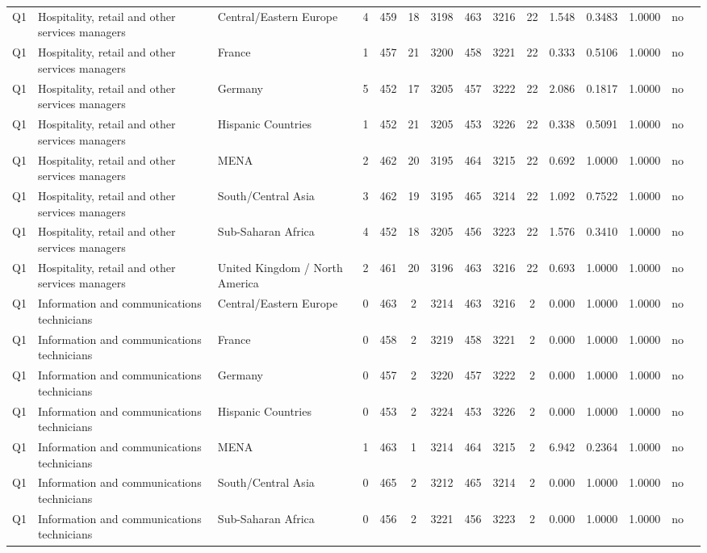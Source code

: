 \begin{longtable}{lllrcccccccccll}
Q1 & Hospitality, retail and other services managers & Central/Eastern Europe & 4 & 459 & 18 & 3198 & 463 & 3216 & 22 & 1.548 & 0.3483 & 1.0000 & no \\
Q1 & Hospitality, retail and other services managers & France & 1 & 457 & 21 & 3200 & 458 & 3221 & 22 & 0.333 & 0.5106 & 1.0000 & no \\
Q1 & Hospitality, retail and other services managers & Germany & 5 & 452 & 17 & 3205 & 457 & 3222 & 22 & 2.086 & 0.1817 & 1.0000 & no \\
Q1 & Hospitality, retail and other services managers & Hispanic Countries & 1 & 452 & 21 & 3205 & 453 & 3226 & 22 & 0.338 & 0.5091 & 1.0000 & no \\
Q1 & Hospitality, retail and other services managers & MENA & 2 & 462 & 20 & 3195 & 464 & 3215 & 22 & 0.692 & 1.0000 & 1.0000 & no \\
Q1 & Hospitality, retail and other services managers & South/Central Asia & 3 & 462 & 19 & 3195 & 465 & 3214 & 22 & 1.092 & 0.7522 & 1.0000 & no \\
Q1 & Hospitality, retail and other services managers & Sub-Saharan Africa & 4 & 452 & 18 & 3205 & 456 & 3223 & 22 & 1.576 & 0.3410 & 1.0000 & no \\
Q1 & Hospitality, retail and other services managers & United Kingdom / North America & 2 & 461 & 20 & 3196 & 463 & 3216 & 22 & 0.693 & 1.0000 & 1.0000 & no \\
Q1 & Information and communications technicians & Central/Eastern Europe & 0 & 463 & 2 & 3214 & 463 & 3216 & 2 & 0.000 & 1.0000 & 1.0000 & no \\
Q1 & Information and communications technicians & France & 0 & 458 & 2 & 3219 & 458 & 3221 & 2 & 0.000 & 1.0000 & 1.0000 & no \\
Q1 & Information and communications technicians & Germany & 0 & 457 & 2 & 3220 & 457 & 3222 & 2 & 0.000 & 1.0000 & 1.0000 & no \\
Q1 & Information and communications technicians & Hispanic Countries & 0 & 453 & 2 & 3224 & 453 & 3226 & 2 & 0.000 & 1.0000 & 1.0000 & no \\
Q1 & Information and communications technicians & MENA & 1 & 463 & 1 & 3214 & 464 & 3215 & 2 & 6.942 & 0.2364 & 1.0000 & no \\
Q1 & Information and communications technicians & South/Central Asia & 0 & 465 & 2 & 3212 & 465 & 3214 & 2 & 0.000 & 1.0000 & 1.0000 & no \\
Q1 & Information and communications technicians & Sub-Saharan Africa & 0 & 456 & 2 & 3221 & 456 & 3223 & 2 & 0.000 & 1.0000 & 1.0000 & no \\

\end{longtable}
